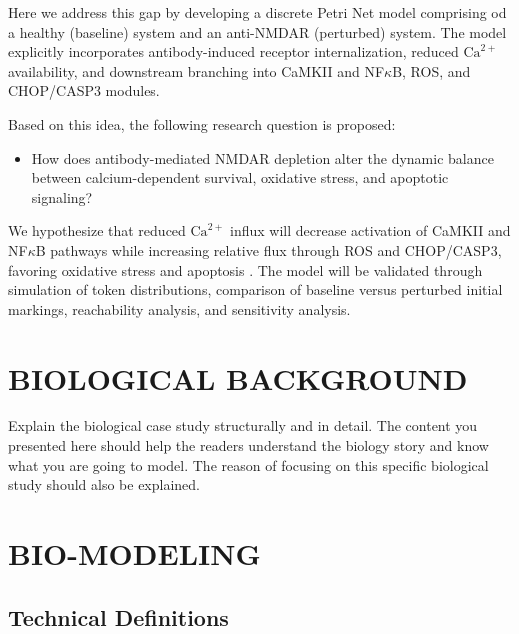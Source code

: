 \documentclass[a4paper,twoside]{article}
\begin{document}
Here we address this gap by developing a discrete Petri Net model comprising od a healthy (baseline) system and an anti-NMDAR (perturbed) system. The model explicitly incorporates antibody-induced receptor internalization, reduced $\text{Ca}^{2+}$ availability, and downstream branching into CaMKII and NF$\kappa$B, ROS, and CHOP/CASP3 modules.

Based on this idea, the following research question is proposed:
\begin{itemize}
    \item How does antibody-mediated NMDAR depletion alter the dynamic balance between calcium-dependent survival, oxidative stress, and apoptotic signaling?
\end{itemize}

We hypothesize that reduced $\text{Ca}^{2+}$ influx will decrease activation of CaMKII and NF$\kappa$B pathways while increasing relative flux through ROS and CHOP/CASP3, favoring oxidative stress and apoptosis \cite{ROSCHOP2_antioxidants, AOX1_oxistress}. The model will be validated through simulation of token distributions, comparison of baseline versus perturbed initial markings, reachability analysis, and sensitivity analysis.

\section{\uppercase{Biological Background}}
Explain the biological case study structurally and in detail. The content you presented here should help the readers understand the biology story and know what you are going to model. The reason of focusing on this specific biological study should also be explained.\\

\section{\uppercase{Bio-modeling}}

\subsection{Technical Definitions}
\end{document}
